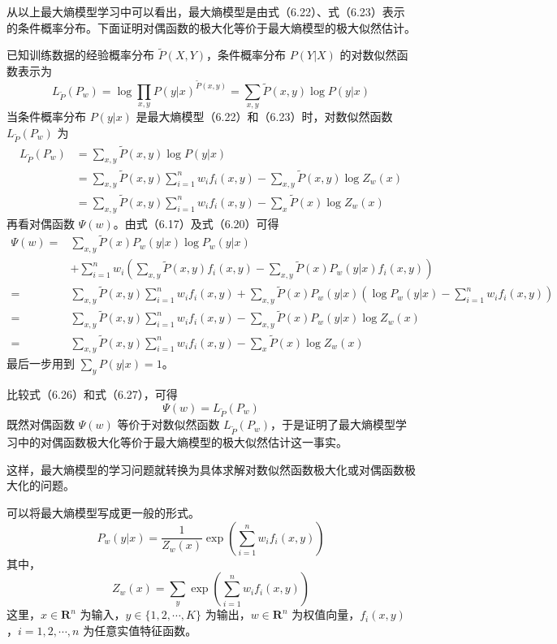 \documentclass[UTF8, 12pt, fontset=fandol, oneside]{ctexart}
\begin{document}
从以上最大熵模型学习中可以看出，最大熵模型是由式（6.22）、式（6.23）表示的条件概率分布。下面证明对偶函数的极大化等价于最大熵模型的极大似然估计。

已知训练数据的经验概率分布 $\tilde{P}(X,Y)$，条件概率分布 $P(Y|X)$ 的对数似然函数表示为
\[
L_{\tilde{P}}(P_w)=\log\prod_{x,y}P(y|x)^{\tilde{P}(x,y)}
=\sum_{x,y}\tilde{P}(x,y)\log P(y|x)
\]
当条件概率分布 $P(y|x)$ 是最大熵模型（6.22）和（6.23）时，对数似然函数 $L_{\tilde{P}}(P_w)$ 为
\begin{equation}
\begin{aligned}
L_{\tilde{P}}(P_w)
&=\sum_{x,y}\tilde{P}(x,y)\log P(y|x)\\
&=\sum_{x,y}\tilde{P}(x,y)\sum_{i=1}^n w_i f_i(x,y)-\sum_{x,y}\tilde{P}(x,y)\log Z_w(x)\\
&=\sum_{x,y}\tilde{P}(x,y)\sum_{i=1}^n w_i f_i(x,y)-\sum_x\tilde{P}(x)\log Z_w(x)
\end{aligned}
\tag{6.26}
\end{equation}
再看对偶函数 $\Psi(w)$。由式（6.17）及式（6.20）可得
\begin{equation}
\begin{aligned}
\Psi(w)
={}&\sum_{x,y}\tilde{P}(x)P_w(y|x)\log P_w(y|x)\\
&+\sum_{i=1}^n w_i\left(\sum_{x,y}\tilde{P}(x,y)f_i(x,y)-\sum_{x,y}\tilde{P}(x)P_w(y|x)f_i(x,y)\right)\\
={}&\sum_{x,y}\tilde{P}(x,y)\sum_{i=1}^n w_i f_i(x,y)
+\sum_{x,y}\tilde{P}(x)P_w(y|x)\left(\log P_w(y|x)-\sum_{i=1}^n w_i f_i(x,y)\right)\\
={}&\sum_{x,y}\tilde{P}(x,y)\sum_{i=1}^n w_i f_i(x,y)-\sum_{x,y}\tilde{P}(x)P_w(y|x)\log Z_w(x)\\
={}&\sum_{x,y}\tilde{P}(x,y)\sum_{i=1}^n w_i f_i(x,y)-\sum_x\tilde{P}(x)\log Z_w(x)
\end{aligned}
\tag{6.27}
\end{equation}
最后一步用到 $\sum_y P(y|x)=1$。

比较式（6.26）和式（6.27），可得
\[
\Psi(w)=L_{\tilde{P}}(P_w)
\]
既然对偶函数 $\Psi(w)$ 等价于对数似然函数 $L_{\tilde{P}}(P_w)$，于是证明了最大熵模型学习中的对偶函数极大化等价于最大熵模型的极大似然估计这一事实。

这样，最大熵模型的学习问题就转换为具体求解对数似然函数极大化或对偶函数极大化的问题。

可以将最大熵模型写成更一般的形式。
\begin{equation}
P_w(y|x)=\frac{1}{Z_w(x)}\exp\left(\sum_{i=1}^n w_i f_i(x,y)\right)
\tag{6.28}
\end{equation}
其中，
\begin{equation}
Z_w(x)=\sum_y\exp\left(\sum_{i=1}^n w_i f_i(x,y)\right)
\tag{6.29}
\end{equation}
这里，$x\in\mathbf{R}^n$ 为输入，$y\in\{1,2,\cdots,K\}$ 为输出，$w\in\mathbf{R}^n$ 为权值向量，$f_i(x,y)$，$i=1,2,\cdots,n$ 为任意实值特征函数。
\end{document}
